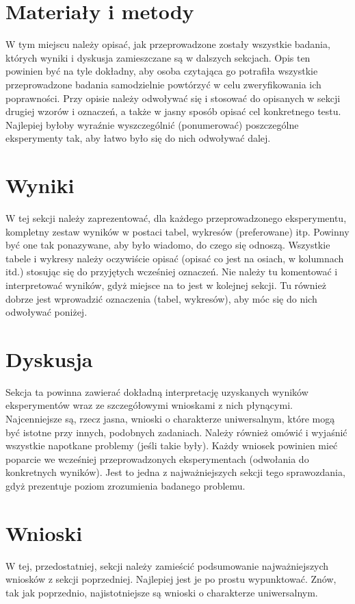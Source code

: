 \documentclass{classrep}
\begin{document}
\section{Materiały i metody}
 {\color{blue}
  W tym miejscu należy opisać, jak przeprowadzone zostały wszystkie badania,
  których wyniki i dyskusja zamieszczane są w dalszych sekcjach. Opis ten
  powinien być na tyle dokładny, aby osoba czytająca go potrafiła wszystkie
  przeprowadzone badania samodzielnie powtórzyć w celu zweryfikowania ich
  poprawności. Przy opisie należy odwoływać się i stosować do
  opisanych w sekcji drugiej wzorów i oznaczeń, a także w jasny sposób opisać
  cel konkretnego testu. Najlepiej byłoby wyraźnie wyszczególnić (ponumerować)
  poszczególne eksperymenty tak, aby łatwo było się do nich odwoływać dalej.}

\section{Wyniki}
 {\color{blue}
  W tej sekcji należy zaprezentować, dla każdego przeprowadzonego eksperymentu,
  kompletny zestaw wyników w postaci tabel, wykresów (preferowane) itp. Powinny
  być one tak ponazywane, aby było wiadomo, do czego się odnoszą. Wszystkie
  tabele i wykresy należy oczywiście opisać (opisać co jest na osiach, w
  kolumnach itd.) stosując się do przyjętych wcześniej oznaczeń. Nie należy tu
  komentować i interpretować wyników, gdyż miejsce na to jest w kolejnej sekcji.
  Tu również dobrze jest wprowadzić oznaczenia (tabel, wykresów), aby móc się do
  nich odwoływać poniżej.}

\section{Dyskusja}
 {\color{blue}
  Sekcja ta powinna zawierać dokładną interpretację uzyskanych wyników
  eksperymentów wraz ze szczegółowymi wnioskami z nich płynącymi. Najcenniejsze
  są, rzecz jasna, wnioski o charakterze uniwersalnym, które mogą być istotne
  przy innych, podobnych zadaniach. Należy również omówić i wyjaśnić wszystkie
  napotkane problemy (jeśli takie były). Każdy wniosek powinien mieć poparcie we
  wcześniej przeprowadzonych eksperymentach (odwołania do konkretnych wyników).
  Jest to jedna z najważniejszych sekcji tego sprawozdania, gdyż prezentuje
  poziom zrozumienia badanego problemu.}

\section{Wnioski}
 {\color{blue}
  W tej, przedostatniej, sekcji należy zamieścić podsumowanie najważniejszych
  wniosków z sekcji poprzedniej. Najlepiej jest je po prostu wypunktować. Znów,
  tak jak poprzednio, najistotniejsze są wnioski o charakterze uniwersalnym.}
\end{document}
